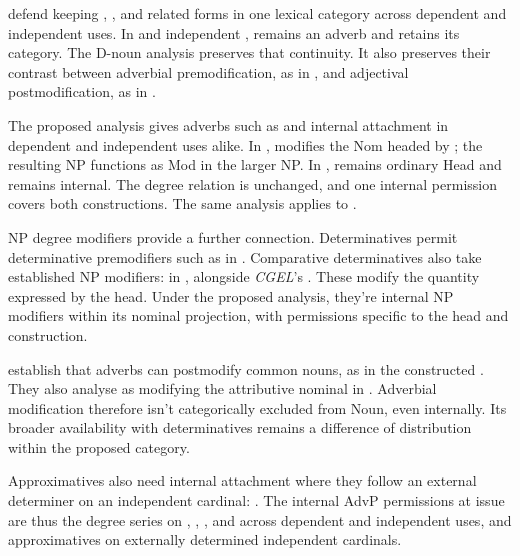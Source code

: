 \documentclass[12pt]{article}
\begin{document}
\textcite[40--42]{payne2010} defend keeping , , and related forms in one lexical category across dependent and independent uses. In  and independent ,  remains an adverb and  retains its category. The D-noun analysis preserves that continuity. It also preserves their contrast between adverbial premodification, as in , and adjectival postmodification, as in .

The proposed analysis gives adverbs such as  and  internal attachment in dependent and independent uses alike. In ,  modifies the Nom headed by ; the resulting  NP functions as Mod in the larger NP. In ,  remains ordinary Head and  remains internal. The degree relation is unchanged, and one internal permission covers both constructions. The same analysis applies to .

NP degree modifiers provide a further connection. Determinatives permit determinative premodifiers such as  in  \citep[393]{huddleston2002}. Comparative determinatives also take established NP modifiers:  in , alongside \textit{CGEL}'s  \citep[432]{huddleston2002}. These modify the quantity expressed by the head. Under the proposed analysis, they're internal NP modifiers within its nominal projection, with permissions specific to the head and construction.

\textcite[42--47]{payne2010} establish that adverbs can postmodify common nouns, as in the constructed . They also analyse  as modifying the attributive nominal  in  \citep[p.~75, n.~3]{payne2010}. Adverbial modification therefore isn't categorically excluded from Noun, even internally. Its broader availability with determinatives remains a difference of distribution within the proposed category.

Approximatives also need internal attachment where they follow an external determiner on an independent cardinal: . The internal AdvP permissions at issue are thus the degree series on , , , and  across dependent and independent uses, and approximatives on externally determined independent cardinals.
\end{document}
